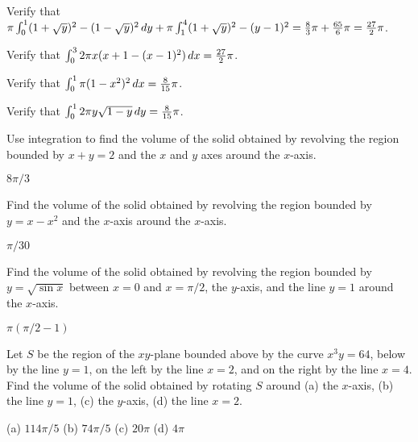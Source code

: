 \begin{exercises}

\begin{exercise}
Verify that $\pi\int_0^1 (1+\sqrt{y})^2-(1-\sqrt{y})^2\, d y+
\pi\int_1^4  (1+\sqrt{y})^2-(y-1)^2={8\over3}\pi + {65\over6}\pi
={27\over2}\pi$.
\end{exercise}

\begin{exercise} Verify that $\int_0^3 2\pi x(x+1-(x-1)^2)\, d x={27\over2}\pi$.
\end{exercise}

\begin{exercise} Verify that $\int_0^1 \pi(1-x^2)^2\, d x={8\over15}\pi$.
\end{exercise}

\begin{exercise} Verify that $\int_0^1 2\pi y \sqrt{1-y}\, d y={8\over15}\pi$.
\end{exercise}

\begin{exercise}
Use integration to find the volume of the solid obtained by revolving 
the region bounded by $x+y=2$ and the $x$ and $y$ axes around the
$x$-axis. 
\begin{answer} $8\pi/3$
\end{answer}\end{exercise}

\begin{exercise}
Find the volume of the solid obtained by revolving 
the region bounded by $y=x-x^2$
and the $x$-axis around the
$x$-axis. 
\begin{answer} $\pi/30$
\end{answer}\end{exercise}

\begin{exercise}
Find the volume of the solid obtained by revolving 
the region bounded by $y=\sqrt{\sin x}$ between $x=0$ and
$x=\pi/2$, the $y$-axis, and the line
$y=1$ around the
$x$-axis. 
\begin{answer} $\pi(\pi/2-1)$
\end{answer}\end{exercise}

\begin{exercise}
Let $S$ be the region of the $xy$-plane bounded above by the curve
$x^3y=64$, below by the line $y=1$, on the left by  the line $x=2$, and
on the right by the line $x=4$.  Find
the volume of the solid obtained by rotating $S$ around (a) the $x$-axis,
(b) the line $y=1$, (c) the $y$-axis, (d) the line $x=2$.
\begin{answer} (a) $114\pi/5$ (b) $74\pi/5$ (c) $20\pi$\hfill\break
(d) $4\pi$
\end{answer}\end{exercise}


\end{exercises}
